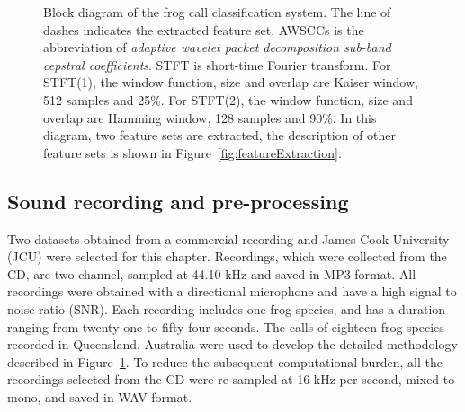 \begin{figure}[htb!] %
\caption[Block diagram of the frog call classification system for wavelet-based feature extraction]{Block diagram of the frog call classification system. The line of dashes indicates the extracted feature set. AWSCCs is the abbreviation of \textit{adaptive wavelet packet decomposition sub-band cepstral coefficients}. STFT is short-time Fourier transform. For STFT(1), the window function, size and overlap are Kaiser window, 512 samples and 25\%. For STFT(2), the window function, size and overlap are Hamming window, 128 samples and 90\%. In this diagram, two feature sets are extracted, the description of other feature sets is shown in Figure~\ref{fig:featureExtraction}.}
\label{fig:Ch5_flowchart} 
\end{figure}


\subsection{Sound recording and pre-processing}

Two datasets obtained from a commercial recording \citep{CD} and James Cook University (JCU) were selected for this chapter. 
Recordings, which were collected from the CD, are two-channel, sampled at 44.10 kHz and saved in MP3 format. All recordings were obtained with a directional microphone and have a high signal to noise ratio (SNR). Each recording includes one frog species, and has a duration ranging from twenty-one to fifty-four seconds. The calls of eighteen frog species recorded in Queensland, Australia were used to develop the detailed methodology described in Figure~\ref{fig:Ch5_flowchart}. To reduce the subsequent computational burden, all the recordings selected from the CD were re-sampled at 16 kHz per second, mixed to mono, and saved in WAV format. 

